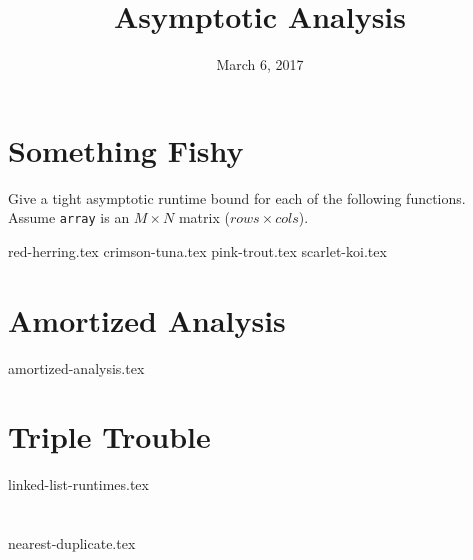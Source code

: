 \documentclass[11pt]{exam}
\title{Asymptotic Analysis}
\date{March 6, 2017}
\begin{document}
\maketitle

\section{Something Fishy}
Give a tight asymptotic runtime bound for each of the following functions. Assume \texttt{array} is an $M \times N$ matrix ($rows \times cols$).
\begin{questions}
{red-herring.tex}
{crimson-tuna.tex}
{pink-trout.tex}
{scarlet-koi.tex}
\end{questions}

\section{Amortized Analysis}
\begin{questions}
{amortized-analysis.tex}
\end{questions}

\clearpage

\section{Triple Trouble}
\begin{questions}
{linked-list-runtimes.tex}
\end{questions}

\clearpage

\section{}
\begin{questions}
{nearest-duplicate.tex}
\end{questions}
\end{document}
